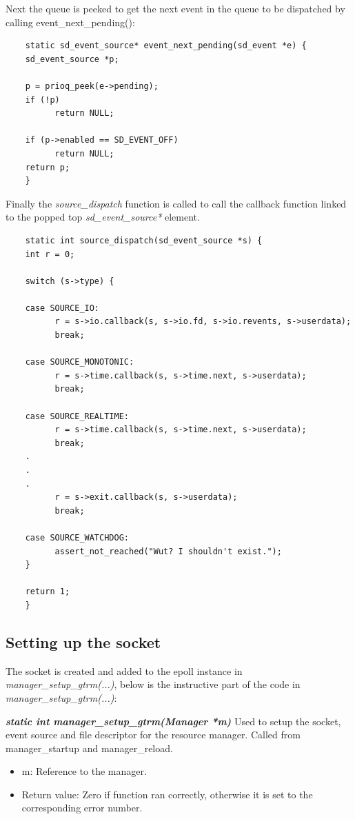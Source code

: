 \documentclass[nobiblatex]{LTHthesis}
\begin{document}
Next the queue is peeked to get the next event in the queue to be dispatched by calling event\_next\_pending():
\begin{verbatim}
	static sd_event_source* event_next_pending(sd_event *e) {
	sd_event_source *p;

	p = prioq_peek(e->pending);
	if (!p)
		  return NULL;

	if (p->enabled == SD_EVENT_OFF)
		  return NULL;
	return p;
	}
\end{verbatim}

Finally the \emph{source\_dispatch} function is called to call the callback function linked to the popped top \emph{sd\_event\_source*} element.

\begin{verbatim}
	static int source_dispatch(sd_event_source *s) {
	int r = 0;

	switch (s->type) {

	case SOURCE_IO:
		  r = s->io.callback(s, s->io.fd, s->io.revents, s->userdata);
		  break;

	case SOURCE_MONOTONIC:
		  r = s->time.callback(s, s->time.next, s->userdata);
		  break;

	case SOURCE_REALTIME:
		  r = s->time.callback(s, s->time.next, s->userdata);
		  break;
	.
	.
	.
		  r = s->exit.callback(s, s->userdata);
		  break;

	case SOURCE_WATCHDOG:
		  assert_not_reached("Wut? I shouldn't exist.");
	}
	
	return 1;
	}
\end{verbatim}  

\subsection{Setting up the socket}

The socket is created and added to the epoll instance in \emph{manager\_setup\_gtrm(...)}, below is the instructive part of the code in \emph{manager\_setup\_gtrm(...)}:




\begin{framed}
		\begin{flushleft}
		
			\textbf{\emph{{static int manager\_setup\_gtrm(Manager *m)}}} \newline
			Used to setup the socket, event source and file descriptor for the resource manager. Called from manager\_startup and manager\_reload.
			\begin{itemize}
			\item m: Reference to the manager.
			\item Return value: Zero if function ran correctly, otherwise it is set to the corresponding error number.
			\end{itemize}
		\end{flushleft}	
\end{framed}
\end{document}
